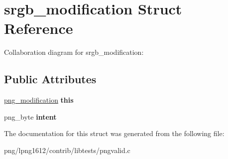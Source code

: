 \hypertarget{structsrgb__modification}{\section{srgb\+\_\+modification Struct Reference}
\label{structsrgb__modification}
}


Collaboration diagram for srgb\+\_\+modification\+:
\subsection*{Public Attributes}
\begin{DoxyCompactItemize}
\item 
\hypertarget{structsrgb__modification_ac0b8f5b0814897eb8c9a932a8b02a849}{\hyperlink{structpng__modification}{png\+\_\+modification} {\bfseries this}}\label{structsrgb__modification_ac0b8f5b0814897eb8c9a932a8b02a849}

\item 
\hypertarget{structsrgb__modification_a34932899309844b548ddb0b66004388b}{png\+\_\+byte {\bfseries intent}}\label{structsrgb__modification_a34932899309844b548ddb0b66004388b}

\end{DoxyCompactItemize}


The documentation for this struct was generated from the following file\+:\begin{DoxyCompactItemize}
\item 
png/lpng1612/contrib/libtests/pngvalid.\+c\end{DoxyCompactItemize}
